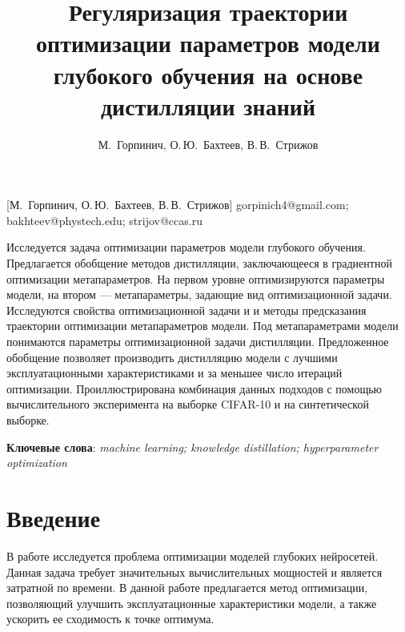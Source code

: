 \documentclass[12pt, twoside]{article}
\begin{document}
\title
    [Оптимизация параметров модели на основе дистилляции знаний] %
    {Регуляризация траектории оптимизации параметров модели глубокого обучения на основе дистилляции знаний}
\author
    [М.~Горпинич] %
    {М.~Горпинич, О.\,Ю.~Бахтеев, В.\,В.~Стрижов} %
    [М.~Горпинич, О.\,Ю.~Бахтеев, В.\,В.~Стрижов] %
\email
    {gorpinich4@gmail.com; bakhteev@phystech.edu;  strijov@ccas.ru}
\abstract
    {Исследуется задача оптимизации параметров модели глубокого обучения. Предлагается обобщение методов дистилляции, заключающееся в градиентной оптимизации метапараметров. На первом уровне оптимизируются параметры модели, на втором --- метапараметры, задающие вид оптимизационной задачи. Исследуются свойства оптимизационной задачи и и методы предсказания траектории оптимизации метапараметров модели. Под метапараметрами модели понимаются параметры оптимизационной задачи дистилляции. Предложенное обобщение позволяет производить дистилляцию модели с лучшими эксплуатационными характеристиками и за меньшее число итераций оптимизации. Проиллюстрирована комбинация данных подходов с помощью вычислительного эксперимента на выборке CIFAR-10 и на синтетической выборке.
	
\bigskip
\noindent
\textbf{Ключевые слова}: \emph {machine learning; knowledge distillation; hyperparameter optimization}
}

\doi{}
\receivedRus{}
\receivedEng{}

\maketitle
\linenumbers

\section{Введение}
В работе исследуется проблема оптимизации моделей глубоких нейросетей. Данная задача требует значительных вычислительных мощностей и является затратной по времени. В данной работе предлагается метод оптимизации, позволяющий улучшить эксплуатационные характеристики модели, а также ускорить ее сходимость к точке оптимума.
\end{document}

